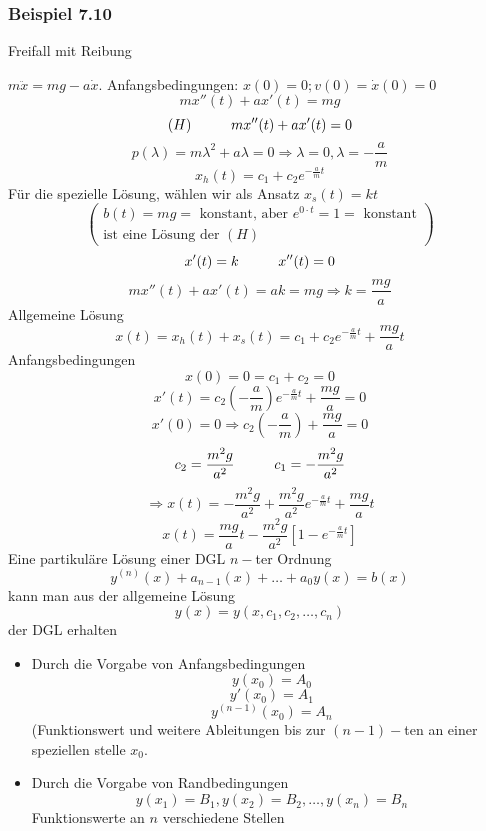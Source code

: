 \subsubsection*{Beispiel 7.10}
Freifall mit Reibung 
\begin{center}
\end{center}
$m\ddot{x}=mg-a\dot{x}$. Anfangsbedingungen: $x(0)=0; v(0)=\dot{x}(0)=0$
\[mx''(t)+ax'(t)=mg\]
\[(H)\hspace{10mm}mx''(t)+ax'(t)=0\]
\[p(\lambda)=m\lambda^2+a\lambda=0\Rightarrow \lambda=0,\lambda=-\frac{a}{m}\]
\[x_h(t)=c_1+c_2e^{-\frac{a}{m}t}\]
Für die spezielle Lösung, wählen wir als Ansatz $x_s(t)=kt$
\[\left( \begin{array}{l}
b(t) = mg = {\text{ konstant, aber  }}{e^{0 \cdot t}} = 1 = {\text{ konstant}}\\
{\text{ist eine Lösung der }}(H)
\end{array} \right)\]
\[x'(t)=k\hspace{10mm}x''(t)=0\]
\[mx''(t)+ax'(t)=ak=mg\Rightarrow k=\frac{mg}{a}\]
Allgemeine Lösung 
\[x(t)=x_h(t)+x_s(t)=c_1+c_2e^{-\frac{a}{m}t}+\frac{mg}{a}t\]
Anfangsbedingungen
\[x(0)=0=c_1+c_2=0\]
\[x'(t)=c_2\left(-\frac{a}{m}\right)e^{-\frac{a}{m}t}+\frac{mg}{a}=0\]
\[x'(0)=0\Rightarrow c_2\left( -\frac{a}{m}\right) +\frac{mg}{a}=0\]
\[c_2=\frac{m^2g}{a^2}\hspace{10mm}c_1=-\frac{m^2g}{a^2}\]
\[\Rightarrow x(t)=-\frac{m^2g}{a^2}+\frac{m^2g}{a^2}e^{-\frac{a}{m}t}+\frac{mg}{a}t\]
\[x(t)=\frac{mg}{a}t-\frac{m^2g}{a^2}\left[ 1-e^{-\frac{a}{m}t}\right]\]
Eine partikuläre Lösung einer DGL $n-$ter Ordnung \[y^{(n)}{(x)}+a_{n-1}(x)+\dots+a_0 y(x)=b(x)\] kann man aus der allgemeine Lösung 
\[y(x)=y(x,c_1,c_2,\dots,c_n)\] der DGL erhalten
\begin{itemize}
\item Durch die Vorgabe von Anfangsbedingungen 
\[y(x_0)=A_0\]
\[y'(x_0)=A_1\]
\[y^{(n-1)}(x_0)=A_n\]
(Funktionswert und weitere Ableitungen bis zur $(n-1)-$ten an einer speziellen stelle $x_0$.
\item Durch die Vorgabe von Randbedingungen 
\[y(x_1)=B_1, y(x_2)=B_2, \dots, y(x_n)=B_n\] Funktionswerte an $n$ verschiedene Stellen
\end{itemize}
